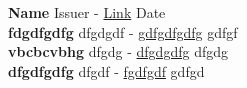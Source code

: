 \documentclass[9pt]{developercv} %
\begin{document}
    
    
    
    
    
    

    
    
        \vspace{-10 pt}
        \vspace{-6pt} 
        
          \hspace{26mm} 
          \textbf{Name} Issuer - \href{Link}{Link} \hfill Date \\
        
          \hspace{26mm} 
          \textbf{fdgdfgdfg} dfgdgdf - \href{gdfgdfgdfg}{gdfgdfgdfg} \hfill gdfgf \\
        
          \hspace{26mm} 
          \textbf{vbcbcvbhg} dfgdg - \href{dfgdgdfg}{dfgdgdfg} \hfill dfgdg \\
        
          \hspace{26mm} 
          \textbf{dfgdfgdfg} dfgdf - \href{fgdfgdf}{fgdfgdf} \hfill gdfgd \\
        
        
    
    
\end{document}
